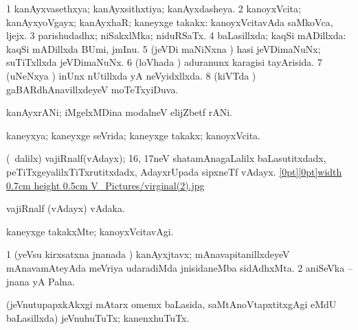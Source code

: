 {{{{{{{{\noindent 
\gl{\pagu}
\expl{}
\bmng
\emng
\eentry

\bentry
{} 
\gl{\gu}
\expl{}
\bmng
\bnum
\num{1} kanAyxvasethxya; kanAyxsithxtiya; kanAyxdasheya. 
\num{2} kanoyxVcita; kanAyxyoVgayx; kanAyxhaR; kaneyxge takakx:  kanoyxVcitavAda saMkoVca, ljejx. 
\num{3} parishudadhx; niSakxlMka; niduRSaTx. 
\num{4} baLasillxda; kaqSi mADillxda:  kaqSi mADillxda BUmi, jmInu. 
\num{5} (jeVDi maNiNxna \vi) hasi jeVDimaNuNx; suTiTxllxda jeVDimaNuNx. 
\num{6} (loVhada \vi) aduranunx karagisi tayArisida. 
\num{7} (uNeNxya \vi) inUnx nUtillxda yA neVyidxllxda. 
\num{8} (kiVTda \vi) gaBARdhAnavillxdeyeV moTeTxyiDuva. 
\enum
\emng

\noindent 
\gl{\pagu}
\expl{}
\bmng
  kanAyxrANi; iMgelxMDina modalneV elijZbetf rANi. 
\emng
\eentry

\bentry 
{} 
\gl{\gu}
\expl{}
\bmng
 kaneyxya; kaneyxge seVrida; kaneyxge takakx; kanoyxVcita. 
\emng
\eentry

\bentry
{} 
\gl{\nA}
\expl{}
\bmng
 (\sA\ \bava dalilx) vajiRnalf(vAdayx); 16, 17neV shatamAnagaLalilx baLasutitxdadx, peTiTxgeyalilxTiTxrutitxdadx, AdayxrUpada sipxneTf  vAdayx. \quad \hyperlink{virginal(2)figure}{\raisebox{-0.15cm}[0pt][0pt]{\pdfimage width 0.7cm height 0.5cm {V_Pictures/virginal(2).jpg}}} 
\emng

\noindent 
\gl{\pagu}
\expl{}
\bmng
\emng
\eentry

\bentry
{} 
\gl{\nA}
\expl{}
\bmng
 vajiRnalf (vAdayx) vAdaka. 
\emng
\eentry

\bentry
{} 
\gl{\kirxvi}
\expl{}
\bmng
 kaneyxge takakxMte; kanoyxVcitavAgi. 
\emng
\eentry

\bentry
{}
\gl{\nA}
\expl{}
\bmng
\bnum
\num{1} (yeVsu kirxsatxna jnanada \vi) kanAyxjtavx; mAnavapitanillxdeyeV mAnavamAteyAda meVriya udaradiMda jnisidaneMba sidAdhxMta. 
\num{2} aniSeVka -- jnana yA Palna. 
\enum
\emng
\eentry

\bentry
{}
\gl{\nA}
\expl{}
\bmng
 (jeVnutupapxkAkxgi mAtarx omemx baLasida, saMtAnoVtapxtitxgAgi eMdU baLasillxda) jeVnuhuTuTx; kanenxhuTuTx. 
\emng
\eentry

}}}}}}}}

